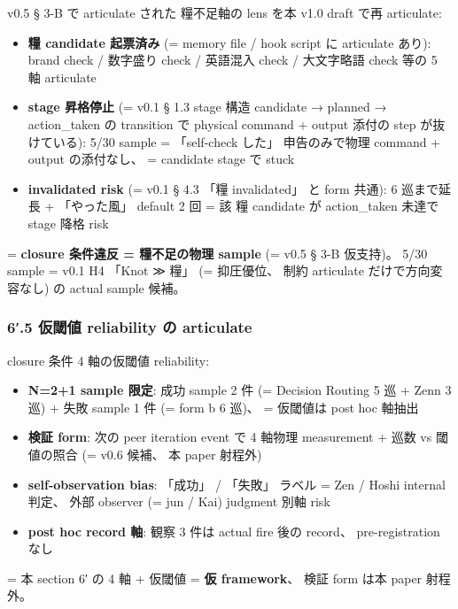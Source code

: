 \documentclass[
]{article}
\providecommand{\tightlist}{%
  \setlength{\itemsep}{0pt}\setlength{\parskip}{0pt}}
\begin{document}
v0.5 § 3-B で articulate された 糧不足軸の lens を本 v1.0 draft で再
articulate:

\begin{itemize}
\tightlist
\item
  \textbf{糧 candidate 起票済み} (= memory file / hook script に
  articulate あり): brand check / 数字盛り check / 英語混入 check /
  大文字略語 check 等の 5 軸 articulate
\item
  \textbf{stage 昇格停止} (= v0.1 § 1.3 stage 構造 candidate → planned →
  action\_taken の transition で physical command + output 添付の step
  が抜けている): 5/30 sample = 「self-check した」 申告のみで物理
  command + output の添付なし、 = candidate stage で stuck
\item
  \textbf{invalidated risk} (= v0.1 § 4.3 「糧 invalidated」 と form
  共通): 6 巡まで延長 + 「やった風」 default 2 回 = 該 糧 candidate が
  action\_taken 未達で stage 降格 risk
\end{itemize}

= \textbf{closure 条件違反 = 糧不足の物理 sample} (= v0.5 § 3-B
仮支持)。 5/30 sample = v0.1 H4 「Knot ≫ 糧」 (= 抑圧優位、 制約
articulate だけで方向変容なし) の actual sample 候補。

\subsubsection{6′.5 仮閾値 reliability の
articulate}\label{ux4eeeux95beux5024-reliability-ux306e-articulate}

closure 条件 4 軸の仮閾値 reliability:

\begin{itemize}
\tightlist
\item
  \textbf{N=2+1 sample 限定}: 成功 sample 2 件 (= Decision Routing 5 巡
  + Zenn 3 巡) + 失敗 sample 1 件 (= form b 6 巡)、 = 仮閾値は post hoc
  軸抽出
\item
  \textbf{検証 form}: 次の peer iteration event で 4 軸物理 measurement
  + 巡数 vs 閾値の照合 (= v0.6 候補、 本 paper 射程外)
\item
  \textbf{self-observation bias}: 「成功」 / 「失敗」 ラベル = Zen /
  Hoshi internal 判定、 外部 observer (= jun / Kai) judgment 別軸 risk
\item
  \textbf{post hoc record 軸}: 観察 3 件は actual fire 後の record、
  pre-registration なし
\end{itemize}

= 本 section 6′ の 4 軸 + 仮閾値 = \textbf{仮 framework}、 検証 form
は本 paper 射程外。
\end{document}
